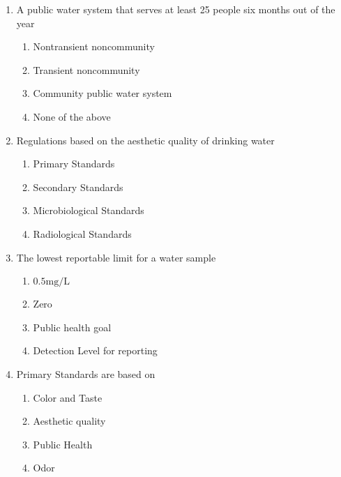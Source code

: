\documentclass{article}
\begin{document}
\begin{enumerate}
\item  A public water system that serves at least 25 people six months out of the year\\
\begin{enumerate}
\item Nontransient noncommunity\\
\item Transient noncommunity\\
\item Community public water system\\
\item None of the above
\end{enumerate}

\item  Regulations based on the aesthetic quality of drinking water\\
\begin{enumerate}
\item Primary Standards\\
\item Secondary Standards\\
\item Microbiological Standards\\
\item Radiological Standards
\end{enumerate}

\item  The lowest reportable limit for a water sample\\
\begin{enumerate}
\item $0.5 \mathrm{mg} / \mathrm{L}$\\
\item Zero\\
\item Public health goal\\
\item Detection Level for reporting
\end{enumerate}

\item  Primary Standards are based on\\
\begin{enumerate}
\item Color and Taste\\
\item Aesthetic quality\\
\item Public Health\\
\item Odor
\end{enumerate}


\end{enumerate}
\end{document}

